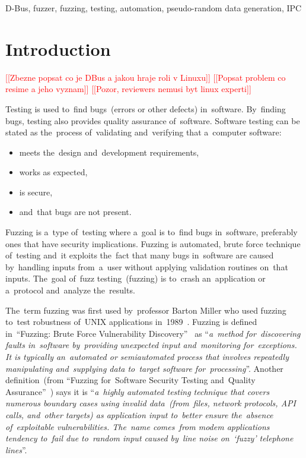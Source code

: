 \documentclass[conference]{IEEEtran}
\newcommand{\addtodo}[1]{\textcolor{red}{[[#1]]}}
\begin{document}
\begin{keywords}
D-Bus, fuzzer, fuzzing, testing, automation, pseudo-random data generation, IPC
\end{keywords}

%
\IEEEpeerreviewmaketitle



\section{Introduction}
\addtodo{Zbezne popsat co je DBus a jakou hraje roli v Linuxu}
\addtodo{Popsat problem co resime a jeho vyznam}
\addtodo{Pozor, reviewers nemusi byt linux experti}

Testing is used to~find bugs~(errors or other defects) in~software. By~finding bugs,
testing also provides quality assurance of~software. Software testing can be stated
as the~process of~validating and~verifying that a~computer software:
\begin{itemize}
	\item meets the~design and~development requirements,
	\item works as expected,
	\item is secure,
	\item and~that bugs are not present.
\end{itemize}

Fuzzing is a~type of~testing where a~goal is to~find bugs in~software, preferably
ones that have security implications. Fuzzing is automated, brute force technique
of~testing and~it exploits the~fact that many bugs in~software are caused
by~handling inputs from~a~user without applying validation routines on~that
inputs. The~goal of~fuzz testing~(fuzzing) is to~crash an~application or a~protocol
and~analyze the~results.

The~term fuzzing was first used by~professor Barton Miller who used fuzzing to~test
robustness of~UNIX applications in~1989~\cite{Fuzzing2}. Fuzzing is defined
in~``Fuzzing: Brute Force Vulnerability Discovery''~\cite[p.~22]{Fuzzing} as
``\emph{a~method for~discovering faults in~software by~providing unexpected
input and~monitoring for~exceptions. It is typically an~automated or semiautomated
process that involves repeatedly manipulating and~supplying data to~target software
for~processing}''.
Another definition~(from ``Fuzzing for~Software Security Testing and~Quality
Assurance''~\cite[p.~1]{Fuzzing2}) says it is ``\emph{a~highly automated testing
technique that covers numerous boundary cases using invalid data~(from~files,
network protocols, API calls, and~other targets) as application input to~better
ensure the~absence of~exploitable vulnerabilities. The~name comes~from modem
applications tendency to~fail due to~random input caused by~line noise on~`fuzzy'
telephone lines}''.
\end{document}
